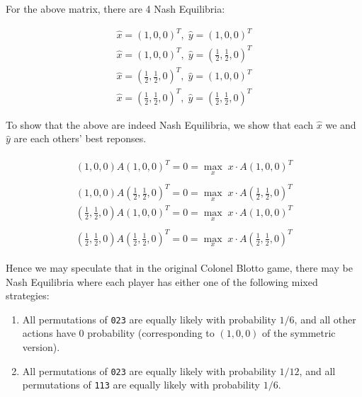 \documentclass [11pt]{article}
\begin{document}
For the above matrix, there are 4 Nash Equilibria:

\begin{align}
  \hat{x} = (1, 0, 0)^T, \; \hat{y} = ( 1, 0, 0 )^T \\
  \hat{x} = (1, 0, 0)^T, \; \hat{y} = (\tfrac{1}{2}, \tfrac{1}{2}, 0)^T \\
  \hat{x} = (\tfrac{1}{2}, \tfrac{1}{2}, 0)^T, \; \hat{y} = (1, 0, 0)^T \\
  \hat{x} = (\tfrac{1}{2}, \tfrac{1}{2}, 0)^T, \; \hat{y} = (\tfrac{1}{2}, \tfrac{1}{2}, 0)^T
\end{align}

To show that the above are indeed Nash Equilibria, we show that each $\hat{x}$ we and $\hat{y}$ are each others' best reponses.

\begin{align}
  \begin{split}
    (1, 0, 0) A ( 1, 0, 0 )^T = 0 = \max_x \;  x \cdot A ( 1, 0, 0 )^T
  \end{split}
  \\
  \begin{split}
    (1, 0, 0) A (\tfrac{1}{2}, \tfrac{1}{2}, 0)^T = 0 = \max_x \;  x  \cdot A (\tfrac{1}{2}, \tfrac{1}{2}, 0)^T \\
    (\tfrac{1}{2}, \tfrac{1}{2}, 0) A ( 1, 0, 0 )^T = 0 = \max_x \;  x  \cdot A ( 1, 0, 0 )^T
  \end{split}
  \\
  \begin{split}
    (\tfrac{1}{2}, \tfrac{1}{2}, 0) A (\tfrac{1}{2}, \tfrac{1}{2}, 0)^T = 0 = \max_x \;  x  \cdot A (\tfrac{1}{2}, \tfrac{1}{2}, 0)^T
  \end{split}
\end{align}

Hence we may speculate that in the original Colonel Blotto game, there may be Nash Equilibria where each player has either one of the following mixed strategies:

\begin{enumerate}
  \item All permutations of \texttt{023} are equally likely with probability $1/6$, and all other actions have 0 probability (corresponding to $(1, 0, 0)$ of the symmetric version).
  \item All permutations of \texttt{023} are equally likely with probability $1/12$, and all permutations of \texttt{113} are equally likely with probability $1/6$.
\end{enumerate}
\end{document}
